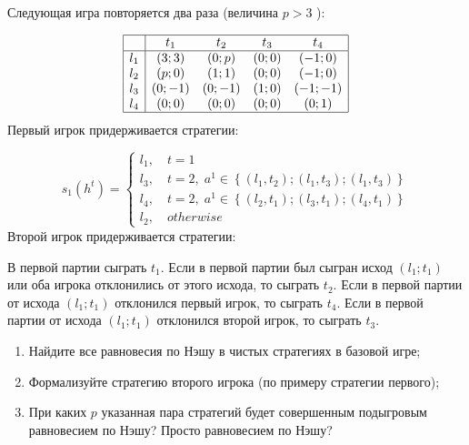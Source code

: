 \begin{problem}
Следующая игра повторяется два раза (величина $p>3$ ):

\[\begin{array}{|c|cccc|}  \hline {} & {t_{1} } & {t_{2} } & {t_{3} } & {t_{4} } \\  \hline {l_{1} } & {\left(3;3\right)} & {\left(0;p\right)} & {\left(0;0\right)} & {\left(-1;0\right)} \\ {l_{2} } & {\left(p;0\right)} & {\left(1;1\right)} & {\left(0;0\right)} & {\left(-1;0\right)} \\ {l_{3} } & {\left(0;-1\right)} & {\left(0;-1\right)} & {\left(1;0\right)} & {\left(-1;-1\right)} \\ {l_{4} } & {\left(0;0\right)} & {\left(0;0\right)} & {\left(0;0\right)} & {\left(0;1\right)} \\  \hline  \end{array}\]
Первый игрок придерживается стратегии:

\[s_{1} \left(h^{t} \right)=\left\{\begin{array}{l} {l_{1},\quad t=1} \\ {l_{3},\quad t=2,\; a^{1} \in \left\{\left(l_{1},t_{2} \right);\left(l_{1},t_{3} \right);\left(l_{1},t_{3} \right)\right\}} \\ {l_{4},\quad t=2,\; a^{1} \in \left\{\left(l_{2},t_{1} \right);\left(l_{3},t_{1} \right);\left(l_{4},t_{1} \right)\right\}} \\ {l_{2},\quad otherwise} \end{array}\right. \]
Второй игрок придерживается стратегии:

В первой партии сыграть  $t_{1}$.
Если в первой партии был сыгран исход  $\left(l_{1} ;t_{1} \right)$  или оба игрока отклонились от этого исхода, то сыграть  $t_{2}$.
Если в первой партии от исхода  $\left(l_{1} ;t_{1} \right)$  отклонился первый игрок, то сыграть  $t_{4} $.
Если в первой партии от исхода  $\left(l_{1} ;t_{1} \right)$  отклонился второй игрок, то сыграть  $t_{3} $.
\begin{enumerate}
\item Найдите все равновесия по Нэшу в чистых стратегиях в базовой игре;\par
\item Формализуйте стратегию второго игрока (по примеру стратегии первого);\par
\item  При каких  $p$  указанная пара стратегий будет совершенным подыгровым равновесием по Нэшу? Просто равновесием по Нэшу?
\end{enumerate}


\begin{sol}

\end{sol}
\end{problem}



